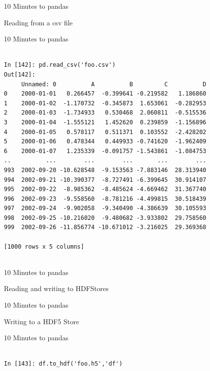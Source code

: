 \documentclass{beamer}
\begin{document}
\begin{frame}[t]{10 Minutes to pandas}

Reading from a csv file

\end{frame}


\begin{frame}[t,fragile]{10 Minutes to pandas}


	\scriptsize
\begin{verbatim}

In [142]: pd.read_csv('foo.csv')
Out[142]: 
     Unnamed: 0          A          B         C          D
0    2000-01-01   0.266457  -0.399641 -0.219582   1.186860
1    2000-01-02  -1.170732  -0.345873  1.653061  -0.282953
2    2000-01-03  -1.734933   0.530468  2.060811  -0.515536
3    2000-01-04  -1.555121   1.452620  0.239859  -1.156896
4    2000-01-05   0.578117   0.511371  0.103552  -2.428202
5    2000-01-06   0.478344   0.449933 -0.741620  -1.962409
6    2000-01-07   1.235339  -0.091757 -1.543861  -1.084753
..          ...        ...        ...       ...        ...
993  2002-09-20 -10.628548  -9.153563 -7.883146  28.313940
994  2002-09-21 -10.390377  -8.727491 -6.399645  30.914107
995  2002-09-22  -8.985362  -8.485624 -4.669462  31.367740
996  2002-09-23  -9.558560  -8.781216 -4.499815  30.518439
997  2002-09-24  -9.902058  -9.340490 -4.386639  30.105593
998  2002-09-25 -10.216020  -9.480682 -3.933802  29.758560
999  2002-09-26 -11.856774 -10.671012 -3.216025  29.369368

[1000 rows x 5 columns]


\end{verbatim}


\end{frame}


\begin{frame}[t]{10 Minutes to pandas}

Reading and writing to HDFStores

\end{frame}


\begin{frame}[t]{10 Minutes to pandas}

Writing to a HDF5 Store

\end{frame}


\begin{frame}[t,fragile]{10 Minutes to pandas}


	\scriptsize
\begin{verbatim}

In [143]: df.to_hdf('foo.h5','df')


\end{verbatim}


\end{frame}
\end{document}
